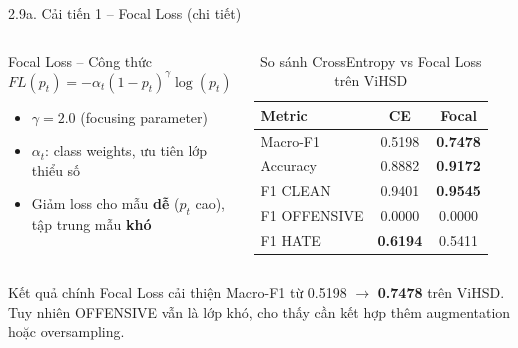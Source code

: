 \documentclass[11pt, aspectratio=169]{beamer}
\begin{document}
\begin{frame}[shrink=8]{2.9a. Cải tiến 1 -- Focal Loss (chi tiết)}

\begin{columns}[T]
  \begin{block}{Focal Loss -- Công thức}
    $$FL(p_t) = -\alpha_t (1-p_t)^\gamma \log(p_t)$$
    \begin{itemize}
      \item $\gamma = 2.0$ (focusing parameter)
      \item $\alpha_t$: class weights, ưu tiên lớp thiểu số
      \item Giảm loss cho mẫu \textbf{dễ} ($p_t$ cao), tập trung mẫu \textbf{khó}
    \end{itemize}
  \end{block}

  \begin{table}[h]
    \centering
    \caption{So sánh CrossEntropy vs Focal Loss trên ViHSD}
    \vspace{0.1cm}
    \scriptsize
    \begin{tabular}{lcc}
      \toprule
      \textbf{Metric} & \textbf{CE} & \textbf{Focal} \\
      \midrule
      Macro-F1 & 0.5198 & \textbf{0.7478} \\
      Accuracy & 0.8882 & \textbf{0.9172} \\
      F1 CLEAN & 0.9401 & \textbf{0.9545} \\
      F1 OFFENSIVE & 0.0000 & 0.0000 \\
      F1 HATE & \textbf{0.6194} & 0.5411 \\
      \bottomrule
    \end{tabular}
  \end{table}
\end{columns}

\vspace{0.2cm}
\begin{block}{Kết quả chính}
  Focal Loss cải thiện Macro-F1 từ 0.5198 $\rightarrow$ \textbf{0.7478} trên ViHSD. Tuy nhiên OFFENSIVE vẫn là lớp khó, cho thấy cần kết hợp thêm augmentation hoặc oversampling.
\end{block}
\end{frame}
\end{document}
